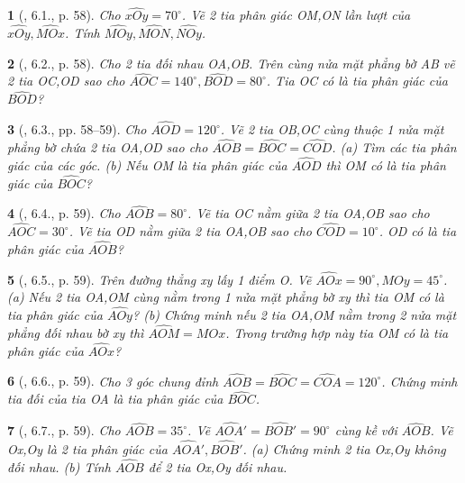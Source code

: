 \documentclass{article}
\newtheorem{baitoan}{}
\begin{document}
\begin{baitoan}[\cite{TLCT_THCS_Toan_6_hinh_hoc}, 6.1., p. 58]
	Cho $\widehat{xOy} = 70^\circ$. Vẽ 2 tia phân giác OM,ON lần lượt của $\widehat{xOy},\widehat{MOx}$. Tính $\widehat{MOy},\widehat{MON},\widehat{NOy}$.
\end{baitoan}

\begin{baitoan}[\cite{TLCT_THCS_Toan_6_hinh_hoc}, 6.2., p. 58]
	Cho 2 tia đối nhau OA,OB. Trên cùng nửa mặt phẳng bờ AB vẽ 2 tia OC,OD sao cho $\widehat{AOC} = 140^\circ,\widehat{BOD} = 80^\circ$. Tia OC có là tia phân giác của $\widehat{BOD}$?
\end{baitoan}

\begin{baitoan}[\cite{TLCT_THCS_Toan_6_hinh_hoc}, 6.3., pp. 58--59]
	Cho $\widehat{AOD} = 120^\circ$. Vẽ 2 tia OB,OC cùng thuộc 1 nửa mặt phẳng bờ chứa 2 tia OA,OD sao cho $\widehat{AOB} = \widehat{BOC} = \widehat{COD}$. (a) Tìm các tia phân giác của các góc. (b) Nếu OM là tia phân giác của $\widehat{AOD}$ thì OM có là tia phân giác của $\widehat{BOC}$?
\end{baitoan}

\begin{baitoan}[\cite{TLCT_THCS_Toan_6_hinh_hoc}, 6.4., p. 59]
	Cho $\widehat{AOB} = 80^\circ$. Vẽ tia OC nằm giữa 2 tia OA,OB sao cho $\widehat{AOC} = 30^\circ$. Vẽ tia OD nằm giữa 2 tia OA,OB sao cho $\widehat{COD} = 10^\circ$. OD có là tia phân giác của $\widehat{AOB}$?
\end{baitoan}

\begin{baitoan}[\cite{TLCT_THCS_Toan_6_hinh_hoc}, 6.5., p. 59]
	Trên đường thẳng xy lấy 1 điểm O. Vẽ $\widehat{AOx} = 90^\circ,\widehat{MOy} = 45^\circ$. (a) Nếu 2 tia OA,OM cùng nằm trong 1 nửa mặt phẳng bờ xy thì tia OM có là tia phân giác của $\widehat{AOy}$? (b) Chứng minh nếu 2 tia OA,OM nằm trong 2 nửa mặt phẳng đối nhau bờ xy thì $\widehat{AOM} = \widehat{MOx}$. Trong trường hợp này tia OM có là tia phân giác của $\widehat{AOx}$?
\end{baitoan}

\begin{baitoan}[\cite{TLCT_THCS_Toan_6_hinh_hoc}, 6.6., p. 59]
	Cho 3 góc chung đỉnh $\widehat{AOB} = \widehat{BOC} = \widehat{COA} = 120^\circ$. Chứng minh tia đối của tia OA là tia phân giác của $\widehat{BOC}$.
\end{baitoan}

\begin{baitoan}[\cite{TLCT_THCS_Toan_6_hinh_hoc}, 6.7., p. 59]
	Cho $\widehat{AOB} = 35^\circ$. Vẽ $\widehat{AOA'} = \widehat{BOB'} = 90^\circ$ cùng kề với $\widehat{AOB}$. Vẽ Ox,Oy là 2 tia phân giác của $\widehat{AOA'},\widehat{BOB'}$. (a) Chứng minh 2 tia Ox,Oy không đối nhau. (b) Tính $\widehat{AOB}$ để 2 tia Ox,Oy đối nhau.
\end{baitoan}
\end{document}
